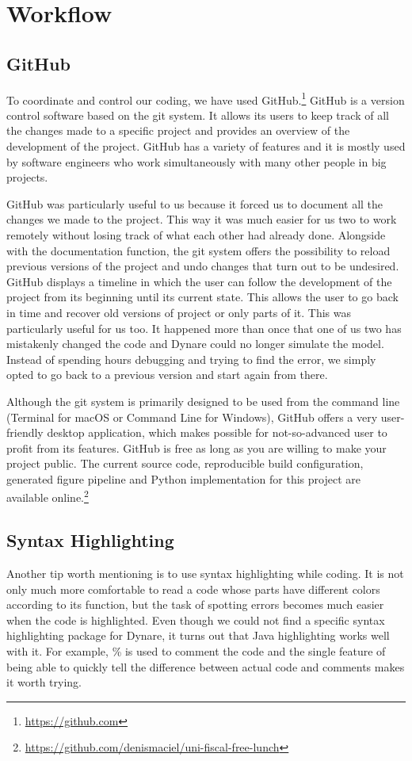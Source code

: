\section{Workflow}

\subsection*{GitHub}
\label{sub:GitHub}

To coordinate and control our coding, we have used GitHub.\footnote{\url{https://github.com}} GitHub is a version control software based on the git system. It allows its users to keep track of all the changes made to a specific project and provides an overview of the development of the project. GitHub has a variety of features and it is mostly used by software engineers who work simultaneously with many other people in big projects.
\par
\bigskip
GitHub was particularly useful to us because it forced us to document all the changes we made to the project. This way it was much easier for us two to work remotely without losing track of what each other had already done. Alongside with the documentation function, the git system offers the possibility to reload previous versions of the project and undo changes that turn out to be undesired. GitHub displays a timeline in which the user can follow the development of the project from its beginning until its current state. This allows the user to go back in time and recover old versions of project or only parts of it. This was particularly useful for us too. It happened more than once that one of us two has mistakenly changed the code and Dynare could no longer simulate the model. Instead of spending hours debugging and trying to find the error, we simply opted to go back to a previous version and start again from there.
\par
\bigskip
Although the git system is primarily designed to be used from the command line (Terminal for macOS or Command Line for Windows), GitHub offers a very user-friendly desktop application, which makes possible for not-so-advanced user to profit from its features. GitHub is free as long as you are willing to make your project public. The current source code, reproducible build configuration, generated figure pipeline and Python implementation for this project are available online.\footnote{\url{https://github.com/denismaciel/uni-fiscal-free-lunch}}


\subsection*{Syntax Highlighting}
\label{sub:Syntax Highlighting}

Another tip worth mentioning is to use syntax highlighting while coding. It is not only much more comfortable to read a code whose parts have different colors according to its function, but the task of spotting errors becomes much easier when the code is highlighted. Even though we could not find a specific syntax highlighting package for Dynare, it turns out that Java highlighting works well with it. For example, \% is used to comment the code and the single feature of being able to quickly tell the difference between actual code and comments makes it worth trying.
